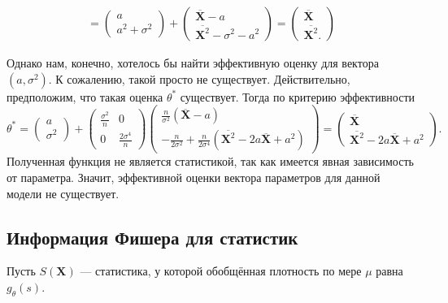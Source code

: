 \begin{example}
\begin{gather*}
    = \begin{pmatrix}a\\a^2+\sigma^2
    \end{pmatrix} + 
    \begin{pmatrix}
    \overline{\mathbf X} - a\\
    \overline{\mathbf X^2} - \sigma^2 - a^2
    \end{pmatrix} = \begin{pmatrix}
    \overline{\mathbf X}\\
    \overline{\mathbf X^2}.
    \end{pmatrix}
    \end{gather*}

    Однако нам, конечно, хотелось бы найти эффективную оценку для вектора $(a, \sigma^2)$. К сожалению, такой просто не существует. Действительно, предположим, что такая оценка $\theta^*$ существует. Тогда по критерию эффективности
    \[
    \theta^* = \begin{pmatrix}a\\\sigma^2\end{pmatrix}+
    \begin{pmatrix}
    \frac{\sigma^2}{n} & 0\\
    0 & \frac{2\sigma^4}{n}
    \end{pmatrix}
    \begin{pmatrix}
    \frac{n}{\sigma^2}(\overline{\mathbf X} - a)\\
    -\frac{n}{2\sigma^2} + \frac{n}{2\sigma^4}\left(\overline{\mathbf X^2} - 2a\overline{\mathbf X} + a^2\right)
    \end{pmatrix} = \begin{pmatrix}
    \overline{\mathbf X}\\
    \overline{\mathbf X^2} - 2a\overline{\mathbf X} + a^2
    \end{pmatrix}.
    \]
    Полученная функция не является статистикой, так как имеется явная зависимость от параметра. Значит, эффективной оценки вектора параметров для данной модели не существует.
\end{example}

\subsection{Информация Фишера для статистик}\label{stat_information}


Пусть $S(\mathbf X)$ --- статистика, у которой обобщённая плотность по мере $\mu$ равна $g_{\theta}(s)$.

